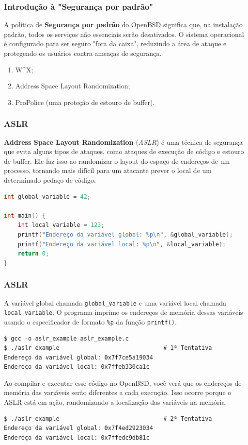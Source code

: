 \documentclass[9pt,xcolor=table]{beamer}
\begin{document}
\begin{frame}
\frametitle{Introdução à "Segurança por padrão"}
\justifying
A política de \textbf{Segurança por padrão} do OpenBSD significa que, na instalação padrão, todos os serviços não essenciais serão desativados. O sistema operacional é configurado para ser seguro "fora da caixa", reduzindo a área de ataque e protegendo os usuários contra ameaças de segurança.
\vspace{0.5cm}
\begin{enumerate}
 \item W\^{}X;
 \item Address Space Layout Randomization;
 \item ProPolice (uma proteção de estouro de buffer).
\end{enumerate}
\end{frame}
\begin{frame}[fragile]
\frametitle{ASLR}
\justifying
\textbf{Address Space Layout Randomization} (\textit{ASLR}) é uma técnica de segurança que evita alguns tipos de ataques, como ataques de execução de código e estouro de buffer. Ele faz isso ao randomizar o layout do espaço de endereços de um processo, tornando mais difícil para um atacante prever o local de um determinado pedaço de código.
\vspace{0.5cm}
\begin{lstlisting}[language=C]
int global_variable = 42;

int main() {
    int local_variable = 123;
    printf("Endereço da variável global: %p\n", &global_variable);
    printf("Endereço da variável local: %p\n", &local_variable);
    return 0;
}
\end{lstlisting}
\end{frame}
\begin{frame}[fragile]
\frametitle{ASLR}
\justifying
A variável global chamada \verb|global_variable| e uma variável local chamada \verb|local_variable|. O programa imprime os endereços de memória dessas variáveis usando o especificador de formato \verb|%p| da função \verb|printf()|.

\begin{lstlisting}
$ gcc -o aslr_example aslr_example.c
$ ./aslr_example                              # 1ª Tentativa
Endereço da variável global: 0x7f7ce5a19034
Endereço da variável local: 0x7ffeb330ca1c
\end{lstlisting}
\vspace{0.1cm}
Ao compilar e executar esse código no OpenBSD, você verá que os endereços de memória das variáveis serão diferentes a cada execução. Isso ocorre porque o ASLR está em ação, randomizando a localização das variáveis na memória.
\begin{lstlisting}
$ ./aslr_example                              # 2ª Tentativa
Endereço da variável global: 0x7f4ed2923034
Endereço da variável local: 0x7ffedc9db81c
\end{lstlisting}
\end{frame}
\end{document}
